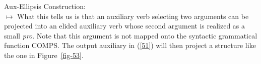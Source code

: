 \documentclass[output=paper
                ,modfonts
                ,nonflat
	        ,collection
	        ,collectionchapter
	        ,collectiontoclongg
 	        ,biblatex
                ,babelshorthands
                ,newtxmath
                ,draftmode
                ,colorlinks, citecolor=brown
]{./langsci/langscibook}
\begin{document}
{


\ea\label{52}
Aux-Ellipsis Construction:\\
 $\mapsto$ 
\z
What this tells us is that an auxiliary verb selecting two arguments
can be projected into an elided auxiliary verb whose second argument
is realized as a small \emph{pro}. Note that this argument is not mapped
onto the syntactic grammatical function COMPS. The output auxiliary
in (\ref{51}) will then project a structure like the one
in Figure~\ref{fig-53}.

}
\end{document}
